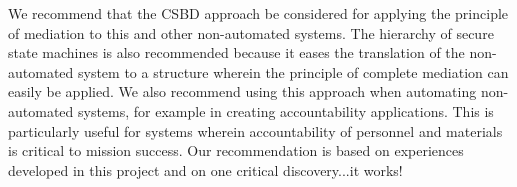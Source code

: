 We recommend that the CSBD approach be considered for applying the principle of mediation
to this and other non-automated systems.  The hierarchy of secure state machines is also
recommended because it eases the translation of the non-automated system to a structure
wherein the principle of complete mediation can easily be applied.  We also recommend using
this approach when automating non-automated systems, for example in creating accountability
applications.  This is particularly useful for systems wherein accountability of personnel
and materials is critical to mission success.  Our recommendation is based on experiences
developed in this project and on one critical discovery...it works!

